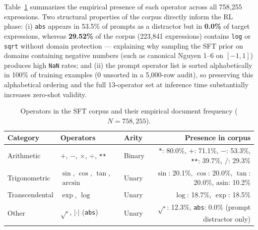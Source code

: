 Table~\ref{tab:operators} summarizes the empirical presence of each operator across all 758{,}255 expressions. Two structural properties of the corpus directly inform the RL phase: (i) \texttt{abs} appears in 53.5\% of prompts as a distractor but in \textbf{0.0\%} of target expressions, whereas \textbf{29.52\%} of the corpus (223{,}841 expressions) contains \texttt{log} or \texttt{sqrt} without domain protection --- explaining why sampling the SFT prior on domains containing negative numbers (such as canonical Nguyen 1--6 on $[-1,1]$) produces high \texttt{NaN} rates; and (ii) the prompt operator list is sorted alphabetically in 100\% of training examples (0 unsorted in a 5{,}000-row audit), so preserving this alphabetical ordering and the full 13-operator set at inference time substantially increases zero-shot validity.

\begin{table}[htbp]
    \centering
    \caption{Operators in the SFT corpus and their empirical document frequency ($N = 758{,}255$).}
    \label{tab:operators}
    \begin{tabular}{lllr}
    \toprule
    \textbf{Category} & \textbf{Operators} & \textbf{Arity} & \textbf{Presence in corpus} \\
    \midrule
    Arithmetic & $+$, $-$, $\times$, $\div$, \texttt{**} & Binary & $*$: 80.0\%, $+$: 71.1\%, $-$: 53.3\%, \texttt{**}: 39.7\%, $/$: 29.3\% \\
    Trigonometric & $\sin$, $\cos$, $\tan$, $\arcsin$ & Unary & $\sin$: 20.1\%, $\cos$: 20.0\%, $\tan$: 20.0\%, $\text{asin}$: 10.2\% \\
    Transcendental & $\exp$, $\log$ & Unary & $\log$: 18.7\%, $\exp$: 18.5\% \\
    Other & $\sqrt{\cdot}$, $|\cdot|$ (\texttt{abs}) & Unary & $\sqrt{\cdot}$: 12.3\%, \texttt{abs}: 0.0\% (prompt distractor only) \\
    \bottomrule
    \end{tabular}
\end{table}

